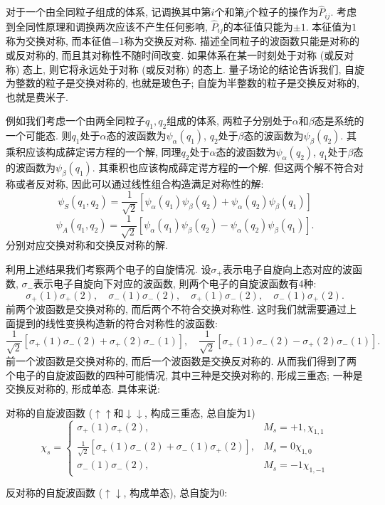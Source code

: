 对于一个由全同粒子组成的体系, 记调换其中第$i$个和第$j$个粒子的操作为$\hat{P}_{ij}$. 考虑到全同性原理和调换两次应该不产生任何影响, $\hat{P}_{ij}$的本征值只能为$\pm 1$. 本征值为$1$称为交换对称, 而本征值$-1$称为交换反对称. 描述全同粒子的波函数只能是对称的或反对称的, 而且其对称性不随时间改变. 如果体系在某一时刻处于对称 (或反对称) 态上, 则它将永远处于对称 (或反对称) 的态上. 量子场论的结论告诉我们, 自旋为整数的粒子是交换对称的, 也就是玻色子; 自旋为半整数的粒子是交换反对称的, 也就是费米子.

例如我们考虑一个由两全同粒子$q_1, q_2$组成的体系, 两粒子分别处于$\alpha$和$\beta$态是系统的一个可能态. 则$q_1$处于$\alpha$态的波函数为$\psi_\alpha(q_1)$, $q_2$处于$\beta$态的波函数为$\psi_\beta(q_2)$. 其乘积应该构成薛定谔方程的一个解, 同理$q_2$处于$\alpha$态的波函数为$\psi_\alpha(q_2)$, $q_1$处于$\beta$态的波函数为$\psi_\beta(q_1)$. 其乘积也应该构成薛定谔方程的一个解. 但这两个解不符合对称或者反对称, 因此可以通过线性组合构造满足对称性的解:
\[
\psi_S(q_1, q_2) = \frac{1}{\sqrt{2}} [\psi_\alpha(q_1)\psi_\beta(q_2) + \psi_\alpha(q_2)\psi_\beta(q_1)]
\]
\[
\psi_A(q_1, q_2) = \frac{1}{\sqrt{2}} [\psi_\alpha(q_1)\psi_\beta(q_2) - \psi_\alpha(q_2)\psi_\beta(q_1)].
\]
分别对应交换对称和交换反对称的解.

利用上述结果我们考察两个电子的自旋情况. 设$\sigma_+$表示电子自旋向上态对应的波函数, $\sigma_-$表示电子自旋向下对应的波函数, 則两个电子的自旋波函数有4种:
\[
\sigma_+(1)\sigma_+(2), \quad \sigma_-(1)\sigma_-(2), \quad \sigma_+(1)\sigma_-(2), \quad \sigma_-(1)\sigma_+(2).
\]
前两个波函数是交换对称的, 而后两个不符合交换对称性. 这时我们就需要通过上面提到的线性变换构造新的符合对称性的波函数:
\[
\frac{1}{\sqrt{2}}  [\sigma_+(1)\sigma_-(2) + \sigma_+(2)\sigma_-(1)], \quad \frac{1}{\sqrt{2}}  [\sigma_+(1)\sigma_-(2) - \sigma_+(2)\sigma_-(1)].
\]
前一个波函数是交换对称的, 而后一个波函数是交换反对称的. 从而我们得到了两个电子的自旋波函数的四种可能情况, 其中三种是交换对称的, 形成三重态; 一种是交换反对称的, 形成单态. 具体来说:

对称的自旋波函数 ($\uparrow\uparrow$和$\downarrow\downarrow$, 构成三重态, 总自旋为1)
\[
\chi_s =
\begin{cases}
\sigma_+(1) \sigma_+(2), & M_s = +1, \chi_{1,1} \\
\frac{1}{\sqrt{2}} \left[ \sigma_+(1)\sigma_-(2) + \sigma_-(1)\sigma_+(2) \right], & M_s = 0 \chi_{1,0}\\
\sigma_-(1) \sigma_-(2), & M_s = -1 \chi_{1,-1}
\end{cases}
\]

反对称的自旋波函数 ($\uparrow\downarrow$, 构成单态), 总自旋为0:

